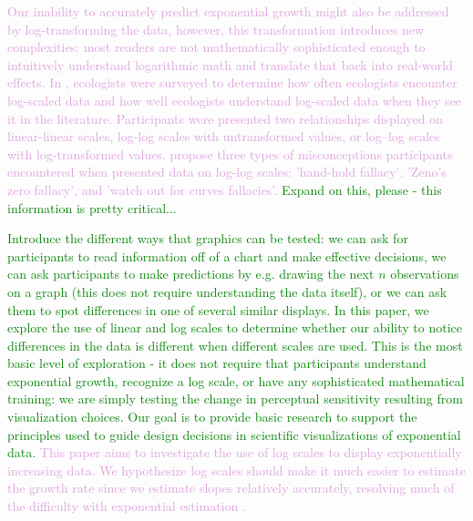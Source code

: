 \documentclass[]{interact}
\theoremstyle{plain}%
\theoremstyle{definition}
\theoremstyle{remark}
\begin{document}
\textcolor{Plum}{Our inability to accurately predict exponential growth might also be addressed by log-transforming the data, however, this transformation introduces new complexities: most readers are not mathematically sophisticated enough to intuitively understand logarithmic math and translate that back into real-world effects.
In \cite{menge_logarithmic_2018}, ecologists were surveyed to determine how often ecologists encounter log-scaled data and how well ecologists understand log-scaled data when they see it in the literature. 
Participants were presented two relationships displayed on linear-linear scales, log-log scales with untransformed values, or log–log scales with log-transformed values. 
\cite{menge_logarithmic_2018} propose three types of misconceptions participants encountered when presented data on log-log scales: 'hand-hold fallacy', 'Zeno's zero fallacy', and 'watch out for curves fallacies'. 
}\textcolor{Green}{Expand on this, please - this information is pretty critical...}

\textcolor{Green}{Introduce the different ways that graphics can be tested: we can ask for participants to read information off of a chart and make effective decisions, we can ask participants to make predictions by e.g. drawing the next $n$ observations on a graph (this does not require understanding the data itself), or we can ask them to spot differences in one of several similar displays. In this paper, we explore the use of linear and log scales to determine whether our ability to notice differences in the data is different when different scales are used. This is the most basic level of exploration - it does not require that participants understand exponential growth, recognize a log scale, or have any sophisticated mathematical training: we are simply testing the change in perceptual sensitivity resulting from visualization choices. Our goal is to provide basic research to support the principles used to guide design decisions in scientific visualizations of exponential data.}\textcolor{Plum}{
This paper aims to investigate the use of log scales to display exponentially increasing data. We hypothesize log scales should make it much easier to estimate the growth rate since we estimate slopes relatively accurately, resolving much of the difficulty with exponential estimation \citep{mosteller_eye_1981}.}
\end{document}
